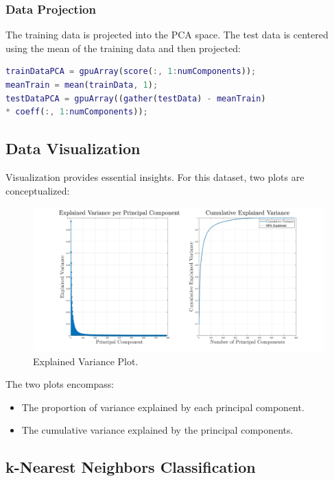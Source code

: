 \subsubsection{Data Projection}

The training data is projected into the PCA space. The test data is centered using the mean of the training data and then projected:
\begin{lstlisting}[language=Matlab]
trainDataPCA = gpuArray(score(:, 1:numComponents));
meanTrain = mean(trainData, 1);
testDataPCA = gpuArray((gather(testData) - meanTrain)
* coeff(:, 1:numComponents));
\end{lstlisting}

\subsection{Data Visualization}

Visualization provides essential insights. For this dataset, two plots are conceptualized:
\begin{figure}[h]
    \centering
    \includegraphics[width=1\textwidth]{PCA_KNN.jpg}
    \caption{Explained Variance Plot.}
    \label{fig:explained_variance} 
\end{figure}

The two plots encompass:
\begin{itemize}
    \item The proportion of variance explained by each principal component.
    \item The cumulative variance explained by the principal components.
\end{itemize}

\subsection{k-Nearest Neighbors Classification}

